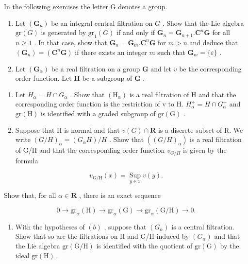 
In the following exercises the letter G denotes a group.

\begin{enumerate}
\def\labelenumi{\arabic{enumi}.}
\item
  Let \((\mathbf{G}_n)\) be an integral central filtration on \(G\) . Show that the Lie algebra \(\mathrm{gr}(G)\) is generated by \(\mathrm{gr}_1(G)\) if and only if \(\mathbf{G}_n = \mathbf{G}_{n+1}.\mathbf{C}^n\mathbf{G}\) for all \(n \geqslant 1\) . In that case, show that \(\mathbf{G}_n = \mathbf{G}_m.\mathbf{C}^n\mathbf{G}\) for \(m > n\) and deduce that \((\mathbf{G}_n) = (\mathbf{C}^n\mathbf{G})\) if there exists an integer \(m\) such that \(\mathbf{G}_m = \{\varepsilon\}\) .
\item
  Let \((\mathbf{G}_{\alpha})\) be a real filtration on a group \(\mathbf{G}\) and let \(v\) be the corresponding order function. Let \(\mathbf{H}\) be a subgroup of \(\mathbf{G}\) .
\end{enumerate}

\begin{enumerate}
\def\labelenumi{(\alph{enumi})}
\item
  Let \(H_{\alpha} = H \cap G_{\alpha}\) . Show that \((\mathrm{H}_{\alpha})\) is a real filtration of H and that the corresponding order function is the restriction of v to H. \(H_{\alpha}^{+} = H \cap G_{\alpha}^{+}\) and \(\mathrm{gr}(\mathrm{H})\) is identified with a graded subgroup of \(\mathrm{gr}(\mathrm{G})\) .
\item
  Suppose that H is normal and that \(v(G) \cap \mathbf{R}\) is a discrete subset of R. We write \((G/H)_{\alpha} = (G_{\alpha}H)/H\) . Show that \(((G/H)_{\alpha})\) is a real filtration of G/H and that the corresponding order function \(v_{G/H}\) is given by the formula
\end{enumerate}

\[
v _ {\mathrm{G/H}} (x) = \operatorname * {S u p} _ {y \in x} v (y).
\]

Show that, for all \(\alpha \in \mathbf{R}\) , there is an exact sequence

\[
0 \rightarrow \mathrm{gr} _ {\alpha} (\mathrm{H}) \rightarrow \mathrm{gr} _ {\alpha} (\mathrm{G}) \rightarrow \mathrm{gr} _ {\alpha} (\mathrm{G} / \mathrm{H}) \rightarrow 0.
\]

\begin{enumerate}
\def\labelenumi{(\alph{enumi})}
\setcounter{enumi}{2}
\tightlist
\item
  With the hypotheses of \((b)\) , suppose that \((G_{\alpha})\) is a central filtration. Show that so are the filtrations on H and G/H induced by \((G_{\alpha})\) and that the Lie algebra \(\mathrm{gr}(\mathrm{G}/\mathrm{H})\) is identified with the quotient of \(\mathrm{gr}(\mathrm{G})\) by the ideal \(\mathrm{gr}(\mathrm{H})\) .
\end{enumerate}

